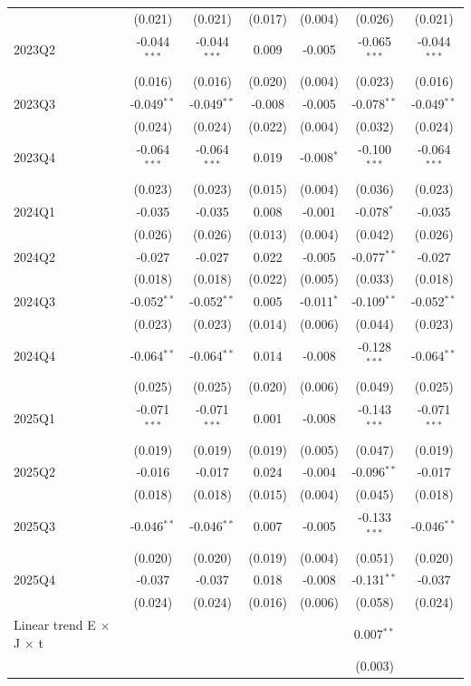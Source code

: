\begin{table}[htbp]
\begin{tabular}{lcccccc}
 & (0.021) & (0.021) & (0.017) & (0.004) & (0.026) & (0.021) \\
2023Q2 & -0.044$^{***}$ & -0.044$^{***}$ & 0.009 & -0.005 & -0.065$^{***}$ & -0.044$^{***}$ \\
 & (0.016) & (0.016) & (0.020) & (0.004) & (0.023) & (0.016) \\
2023Q3 & -0.049$^{**}$ & -0.049$^{**}$ & -0.008 & -0.005 & -0.078$^{**}$ & -0.049$^{**}$ \\
 & (0.024) & (0.024) & (0.022) & (0.004) & (0.032) & (0.024) \\
2023Q4 & -0.064$^{***}$ & -0.064$^{***}$ & 0.019 & -0.008$^{*}$ & -0.100$^{***}$ & -0.064$^{***}$ \\
 & (0.023) & (0.023) & (0.015) & (0.004) & (0.036) & (0.023) \\
2024Q1 & -0.035 & -0.035 & 0.008 & -0.001 & -0.078$^{*}$ & -0.035 \\
 & (0.026) & (0.026) & (0.013) & (0.004) & (0.042) & (0.026) \\
2024Q2 & -0.027 & -0.027 & 0.022 & -0.005 & -0.077$^{**}$ & -0.027 \\
 & (0.018) & (0.018) & (0.022) & (0.005) & (0.033) & (0.018) \\
2024Q3 & -0.052$^{**}$ & -0.052$^{**}$ & 0.005 & -0.011$^{*}$ & -0.109$^{**}$ & -0.052$^{**}$ \\
 & (0.023) & (0.023) & (0.014) & (0.006) & (0.044) & (0.023) \\
2024Q4 & -0.064$^{**}$ & -0.064$^{**}$ & 0.014 & -0.008 & -0.128$^{***}$ & -0.064$^{**}$ \\
 & (0.025) & (0.025) & (0.020) & (0.006) & (0.049) & (0.025) \\
2025Q1 & -0.071$^{***}$ & -0.071$^{***}$ & 0.001 & -0.008 & -0.143$^{***}$ & -0.071$^{***}$ \\
 & (0.019) & (0.019) & (0.019) & (0.005) & (0.047) & (0.019) \\
2025Q2 & -0.016 & -0.017 & 0.024 & -0.004 & -0.096$^{**}$ & -0.017 \\
 & (0.018) & (0.018) & (0.015) & (0.004) & (0.045) & (0.018) \\
2025Q3 & -0.046$^{**}$ & -0.046$^{**}$ & 0.007 & -0.005 & -0.133$^{***}$ & -0.046$^{**}$ \\
 & (0.020) & (0.020) & (0.019) & (0.004) & (0.051) & (0.020) \\
2025Q4 & -0.037 & -0.037 & 0.018 & -0.008 & -0.131$^{**}$ & -0.037 \\
 & (0.024) & (0.024) & (0.016) & (0.006) & (0.058) & (0.024) \\
Linear trend E $\times$ J $\times$ t &  &  &  &  & 0.007$^{**}$ &  \\
 &  &  &  &  & (0.003) &  \\
\bottomrule
\end{tabular}
\par\vspace{2pt}{\footnotesize Reference quarter 2022Q3 omitted. Standard errors clustered on occupation in parentheses. * p<0.10, ** p<0.05, *** p<0.01. Model 2 replaces the pre-period dummies with the linear trend; its post coefficients are deviations from the extrapolated trend.}
\end{table}

